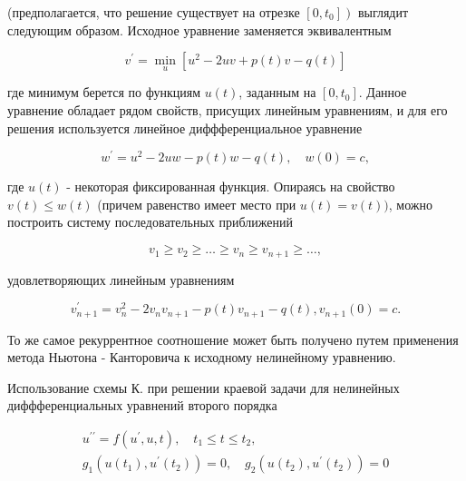 \documentclass[10pt]{article}
\begin{document}
(предполагается, что решение существует на отрезке $\left.\left[0, t_{0}\right]\right)$ выглядит следующим образом. Исходное уравнение заменяется эквивалентным



\[

v^{\prime}=\min _{u}\left[u^{2}-2 u v+p(t) v-q(t)\right]

\]



где минимум берется по функциям $u(t)$, заданным на $\left[0, t_{0}\right]$. Данное уравнение обладает рядом свойств, присущих линейным уравнениям, и для его решения используется линейное диффференциальное уравнение



\[

w^{\prime}=u^{2}-2 u w-p(t) w-q(t), \quad w(0)=c,

\]



где $u(t)$ - некоторая фиксированная функция. Опираясь на свойство $v(t) \leqslant w(t)$ (причем равенство имеет место при $u(t)=v(t))$, можно построить систему последовательных приближений



\[

v_{1} \geqslant v_{2} \geqslant \ldots \geqslant v_{n} \geqslant v_{n+1} \geqslant \ldots,

\]



удовлетворяющих линейным уравнениям



\[

v_{n+1}^{\prime}=v_{n}^{2}-2 v_{n} v_{n+1}-p(t) v_{n+1}-q(t), v_{n+1}(0)=c .

\]



То же самое рекуррентное соотношение может быть получено путем применения метода Ньютона - Канторовича к исходному нелинейному уравнению.



Использование схемы К. при решении краевой задачи для нелинейных диффференциальных уравнений второго порядка



\[

\begin{gathered}

u^{\prime \prime}=f\left(u^{\prime}, u, t\right), \quad t_{1} \leqslant t \leqslant t_{2}, \\

g_{1}\left(u\left(t_{1}\right), u^{\prime}\left(t_{2}\right)\right)=0, \quad g_{2}\left(u\left(t_{2}\right), u^{\prime}\left(t_{2}\right)\right)=0

\end{gathered}

\]
\end{document}
